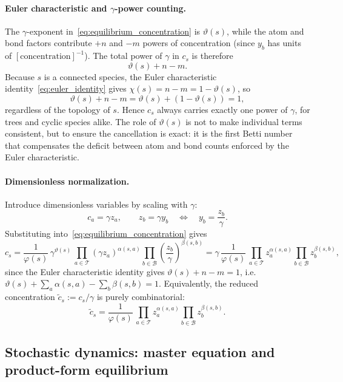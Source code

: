 \documentclass[11pt]{amsart}
\newcommand{\Bonds}{\mathcal{B}}
\newcommand{\Atoms}{\mathcal{T}}
\theoremstyle{definition}
\theoremstyle{plain}
\theoremstyle{remark}
\begin{document}
\paragraph{Euler characteristic and $\gamma$-power counting.}
The $\gamma$-exponent in~\eqref{eq:equilibrium_concentration} is $\vartheta(s)$, while the atom and bond factors contribute $+n$ and $-m$ powers of concentration (since $y_b$ has units of $[\text{concentration}]^{-1}$).
The total power of $\gamma$ in $c_s$ is therefore
\[
\vartheta(s) + n - m.
\]
Because $s$ is a connected species, the Euler characteristic identity~\eqref{eq:euler_identity} gives $\chi(s) = n - m = 1 - \vartheta(s)$, so
\[
\vartheta(s) + n - m = \vartheta(s) + (1 - \vartheta(s)) = 1,
\]
regardless of the topology of $s$.
Hence $c_s$ always carries exactly one power of $\gamma$, for trees and cyclic species alike.
The role of $\vartheta(s)$ is not to make individual terms consistent, but to ensure the cancellation is exact: it is the first Betti number that compensates the deficit between atom and bond counts enforced by the Euler characteristic.

\paragraph{Dimensionless normalization.}
Introduce dimensionless variables by scaling with $\gamma$:
\[
c_a = \gamma z_a,\qquad z_b = \gamma y_b
\quad\Longleftrightarrow\quad
y_b = \frac{z_b}{\gamma}.
\]
Substituting into~\eqref{eq:equilibrium_concentration} gives
\[
c_s
= \frac{1}{\varphi(s)}\,
\gamma^{\vartheta(s)}\,
\prod_{a\in\Atoms}(\gamma z_a)^{\alpha(s,a)}
\prod_{b\in\Bonds}\!\left(\frac{z_b}{\gamma}\right)^{\beta(s,b)}
= \gamma\,\frac{1}{\varphi(s)}\,
\prod_{a\in\Atoms} z_a^{\alpha(s,a)}
\prod_{b\in\Bonds} z_b^{\beta(s,b)},
\]
since the Euler characteristic identity gives $\vartheta(s) + n - m = 1$, i.e.\ $\vartheta(s) + \sum_a\alpha(s,a) - \sum_b\beta(s,b) = 1$.
Equivalently, the reduced concentration $\tilde c_s := c_s/\gamma$ is purely combinatorial:
\[
\tilde c_s
= \frac{1}{\varphi(s)}\,
\prod_{a\in\Atoms} z_a^{\alpha(s,a)}
\prod_{b\in\Bonds} z_b^{\beta(s,b)}.
\]

\subsection{Stochastic dynamics: master equation and product-form equilibrium}
\label{sec:stochastic}
\end{document}
